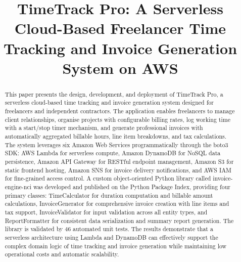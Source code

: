 \documentclass[conference]{IEEEtran}
\begin{document}
\title{TimeTrack Pro: A Serverless Cloud-Based Freelancer Time Tracking and Invoice Generation System on AWS}

\author{
}

\maketitle

\begin{abstract}
This paper presents the design, development, and deployment of TimeTrack Pro, a serverless cloud-based time tracking and invoice generation system designed for freelancers and independent contractors. The application enables freelancers to manage client relationships, organise projects with configurable billing rates, log working time with a start/stop timer mechanism, and generate professional invoices with automatically aggregated billable hours, line item breakdowns, and tax calculations. The system leverages six Amazon Web Services programmatically through the boto3 SDK: AWS Lambda for serverless compute, Amazon DynamoDB for NoSQL data persistence, Amazon API Gateway for RESTful endpoint management, Amazon S3 for static frontend hosting, Amazon SNS for invoice delivery notifications, and AWS IAM for fine-grained access control. A custom object-oriented Python library called invoice-engine-nci was developed and published on the Python Package Index, providing four primary classes: TimeCalculator for duration computation and billable amount calculations, InvoiceGenerator for comprehensive invoice creation with line items and tax support, InvoiceValidator for input validation across all entity types, and ReportFormatter for consistent data serialization and summary report generation. The library is validated by 46 automated unit tests. The results demonstrate that a serverless architecture using Lambda and DynamoDB can effectively support the complex domain logic of time tracking and invoice generation while maintaining low operational costs and automatic scalability.
\end{abstract}

\end{document}
